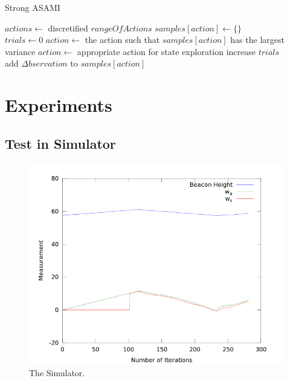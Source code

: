 \documentclass[10pt]{IEEEtran}
\begin{document}
\begin{algorithm*}[t]
\caption{Strong ASAMI}\label{alg:asami}
\begin{algorithmic}
    \State $actions \gets$ discretified $rangeOfActions$
        $samples[action] \gets \{\}$ 
    \EndFor
\EndFunction
\\
 
\State $trials\gets 0$
            \State $action \gets$ the action such that $samples[action]$ has the largest variance
        \Else
            \State $action \gets$ appropriate action for state exploration
        \EndIf
        \State increase $trials$
    \EndWhile
\EndFunction
\\
 
    \State add $\Delta bservation$ to $samples[action]$ 
\EndFunction
\end{algorithmic}
\end{algorithm*}

\section{Experiments}

\subsection{Test in Simulator}

\begin{figure}[h]
\centering
\includegraphics[width=\columnwidth]{simResult.png}
\caption{The Simulator.}
\label{fig:fuelworld}
\end{figure}
\end{document}
